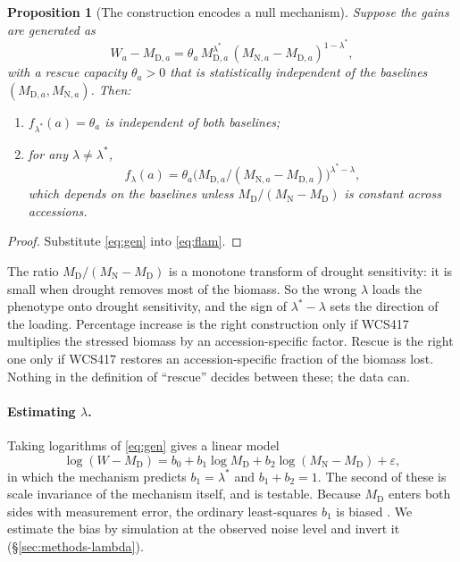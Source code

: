 \documentclass[10pt,twocolumn,a4paper]{article}
\newtheorem{proposition}{Proposition}[section]
\theoremstyle{definition}
\theoremstyle{remark}
\newcommand{\MD}{{M_{\mathrm D}}}
\newcommand{\MN}{{M_{\mathrm N}}}
\newcommand{\WD}{W}
\newcommand{\flam}{f_{\lambda}}
\begin{document}
\begin{proposition}[The construction encodes a null mechanism]
\label{prop:mechanism}
Suppose the gains are generated as
\begin{equation}
  \WD_a-M_{\mathrm D,a}=\theta_a\,M_{\mathrm D,a}^{\lambda^*}\,(M_{\mathrm N,a}-M_{\mathrm D,a})^{1-\lambda^*},
  \label{eq:gen}
\end{equation}
with a rescue capacity $\theta_a>0$ that is statistically independent of
the baselines $(M_{\mathrm D,a},M_{\mathrm N,a})$. Then:
\begin{enumerate}[label=(\roman*),leftmargin=1.8em,itemsep=0pt]
  \item $f_{\lambda^*}(a)=\theta_a$ is independent of both baselines;
  \item for any $\lambda\neq\lambda^*$,
  \[
    \flam(a)=\theta_a\bigl(M_{\mathrm D,a}/(M_{\mathrm N,a}-M_{\mathrm D,a})\bigr)^{\lambda^*-\lambda},
  \]
  which depends on the baselines unless $\MD/(\MN-\MD)$ is constant
  across accessions.
\end{enumerate}
\end{proposition}
\begin{proof}
Substitute \eqref{eq:gen} into \eqref{eq:flam}.
\end{proof}

The ratio $\MD/(\MN-\MD)$ is a monotone transform of drought
sensitivity: it is small when drought removes most of the biomass. So the
wrong $\lambda$ loads the phenotype onto drought sensitivity, and the
sign of $\lambda^*-\lambda$ sets the direction of the loading.
Percentage increase is the right construction only if WCS417 multiplies
the stressed biomass by an accession-specific factor. Rescue is the right
one only if WCS417 restores an accession-specific fraction of the
biomass lost. Nothing in the definition of ``rescue'' decides between
these; the data can.

\paragraph{Estimating $\lambda$.} Taking logarithms of \eqref{eq:gen}
gives a linear model
\begin{equation}
  \log(\WD-\MD)=b_0+b_1\log\MD+b_2\log(\MN-\MD)+\varepsilon,
  \label{eq:loglin}
\end{equation}
in which the mechanism predicts $b_1=\lambda^*$ and $b_1+b_2=1$. The
second of these is scale invariance of the mechanism itself, and is
testable. Because $\MD$ enters both sides with measurement error, the
ordinary least-squares $b_1$ is biased \citep{carroll2006}. We estimate
the bias by simulation at the observed noise level and invert it
(\S\ref{sec:methods-lambda}).
\end{document}
